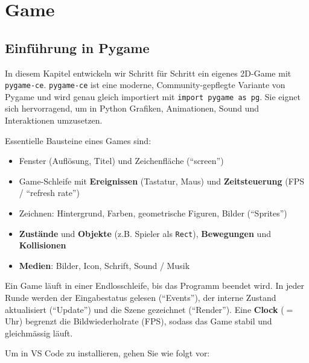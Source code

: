 \chapter{Game}\label{ch:K09_Game}

\section{Einführung in Pygame}
In diesem Kapitel entwickeln wir Schritt für Schritt ein eigenes 2D-Game mit \texttt{pygame-ce}. \texttt{pygame-ce} ist eine moderne, Community-gepflegte Variante von Pygame und wird genau gleich importiert mit \lstinline|import pygame as pg|. Sie eignet sich hervorragend, um in Python Grafiken, Animationen, Sound und Interaktionen umzusetzen.

Essentielle Bausteine eines Games sind:
\begin{itemize}
    \item Fenster (Auflösung, Titel) und Zeichenfläche (\enquote{screen})
    \item Game-Schleife mit \textbf{Ereignissen} (Tastatur, Maus) und \textbf{Zeitsteuerung} (\gls{FPS} / \enquote{refresh rate})
    \item Zeichnen: Hintergrund, Farben, geometrische Figuren, Bilder (\enquote{Sprites})
    \item \textbf{Zustände} und \textbf{Objekte} (z.B. Spieler als \lstinline|Rect|), \textbf{Bewegungen} und \textbf{Kollisionen}
    \item \textbf{Medien}: Bilder, Icon, Schrift, Sound / Musik
\end{itemize}

\begin{mydefinition}
Ein Game läuft in einer Endlosschleife, bis das Programm beendet wird. In jeder Runde werden der Eingabestatus gelesen (\enquote{Events}), der interne Zustand aktualisiert (\enquote{Update}) und die Szene gezeichnet (\enquote{Render}). Eine \textbf{Clock} ($=$ Uhr) begrenzt die Bildwiederholrate (\gls{FPS}), sodass das Game stabil und gleichmässig läuft.
\end{mydefinition}

Um  in VS Code zu installieren, gehen Sie wie folgt vor:


